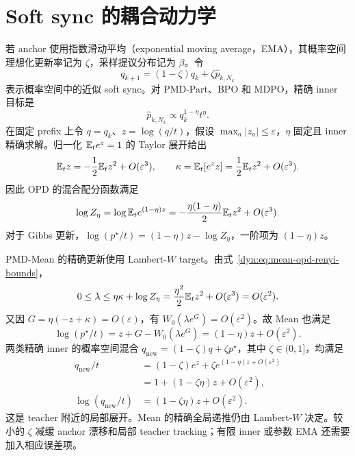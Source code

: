 \section{Soft sync 的耦合动力学}

若 anchor 使用指数滑动平均（exponential moving average，EMA），其概率空间理想化更新率记为 $\zeta$，采样提议分布记为 $\beta$。令
\begin{equation*}
 q_{k+1}=(1-\zeta)q_k+\zeta\widehat p_{k,N_k}
\end{equation*}
表示概率空间中的近似 soft sync。对 PMD-Part、BPO 和 MDPO，精确 inner 目标是
\begin{equation*}
 \widehat p_{k,N_k}\propto q_k^{1-\eta}t^\eta.
\end{equation*}
在固定 prefix 上令 $q=q_k$、$z=\log(q/t)$，假设 $\max_a|z_a|\le\varepsilon$，$\eta$ 固定且 inner 精确求解。归一化 $\mathbb E_te^z=1$ 的 Taylor 展开给出
\begin{equation*}
\mathbb E_tz=-\frac12\mathbb E_tz^2+O(\varepsilon^3),\qquad
\kappa=\mathbb E_t[e^zz]=\frac12\mathbb E_tz^2+O(\varepsilon^3).
\end{equation*}
因此 OPD 的混合配分函数满足
\begin{equation*}
\log Z_\eta=\log\mathbb E_te^{(1-\eta)z}
=-\frac{\eta(1-\eta)}2\mathbb E_tz^2+O(\varepsilon^3).
\end{equation*}
对于 Gibbs 更新，$\log(p^\star/t)=(1-\eta)z-\log Z_\eta$，一阶项为 $(1-\eta)z$。

PMD-Mean 的精确更新使用 Lambert-$W$ target。由式~\eqref{dyn:eq:mean-opd-renyi-bounds}，
\begin{equation*}
0\le\lambda\le\eta\kappa+\log Z_\eta
=\frac{\eta^2}2\mathbb E_tz^2+O(\varepsilon^3)=O(\varepsilon^2).
\end{equation*}
又因 $G=\eta(-z+\kappa)=O(\varepsilon)$，有
$W_0(\lambda e^G)=O(\varepsilon^2)$。故 Mean 也满足
\begin{equation*}
\log(p^\star/t)=z+G-W_0(\lambda e^G)
=(1-\eta)z+O(\varepsilon^2).
\end{equation*}
两类精确 inner 的概率空间混合 $q_{\mathrm{new}}=(1-\zeta)q+\zeta p^\star$，其中 $\zeta\in(0,1]$，均满足
\begin{align*}
q_{\mathrm{new}}/t
&=(1-\zeta)e^z+\zeta e^{(1-\eta)z+O(\varepsilon^2)}\\
&=1+(1-\zeta\eta)z+O(\varepsilon^2),\\
\log(q_{\mathrm{new}}/t)
&=(1-\zeta\eta)z+O(\varepsilon^2).
\end{align*}
这是 teacher 附近的局部展开。Mean 的精确全局递推仍由 Lambert-$W$ 决定。较小的 $\zeta$ 减缓 anchor 漂移和局部 teacher tracking；有限 inner 或参数 EMA 还需要加入相应误差项。

